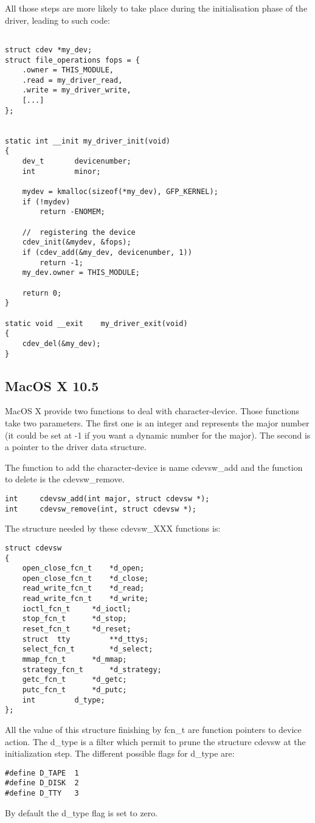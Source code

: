 \documentclass[11pt]{report}
\begin{document}
All those steps are more likely to take place during the initialisation phase
of the driver, leading to such code:

\begin{lstlisting}

struct cdev *my_dev;
struct file_operations fops = {
    .owner = THIS_MODULE,
    .read = my_driver_read,
    .write = my_driver_write,
    [...]
};


static int __init my_driver_init(void)
{
    dev_t       devicenumber;
    int         minor;
    
    mydev = kmalloc(sizeof(*my_dev), GFP_KERNEL);
    if (!mydev)
        return -ENOMEM;

    //  registering the device
    cdev_init(&mydev, &fops);
    if (cdev_add(&my_dev, devicenumber, 1))
        return -1;
    my_dev.owner = THIS_MODULE;

    return 0;
}

static void __exit    my_driver_exit(void)
{
    cdev_del(&my_dev);
}
\end{lstlisting}


\subsection{MacOS X 10.5}

MacOS X provide two functions to deal with character-device.
Those functions take two parameters. The first
one is an integer and represents the major number (it could
be set at -1 if you want a dynamic number for the major). The
second is a pointer to the driver data structure.

The function to add the character-device is name cdevsw\_add and 
the function to delete is the cdevsw\_remove.

\begin{lstlisting}
int		cdevsw_add(int major, struct cdevsw *);
int		cdevsw_remove(int, struct cdevsw *);
\end{lstlisting}

The structure needed by these cdevsw\_XXX functions is:

\begin{lstlisting}
struct cdevsw 
{
	open_close_fcn_t	*d_open;
	open_close_fcn_t	*d_close;
	read_write_fcn_t	*d_read;
	read_write_fcn_t	*d_write;
	ioctl_fcn_t		*d_ioctl;
	stop_fcn_t		*d_stop;
	reset_fcn_t		*d_reset;
	struct	tty 		**d_ttys;
	select_fcn_t		*d_select;
	mmap_fcn_t		*d_mmap;
	strategy_fcn_t		*d_strategy;
	getc_fcn_t		*d_getc;
	putc_fcn_t		*d_putc;
	int			d_type;
};
\end{lstlisting}
%
%
All the value of this structure finishing by fcn\_t are function pointers
to device action. The d\_type is a filter which permit to prune the structure
cdevsw at the initialization step. %
The different possible flags for d\_type are:
\begin{lstlisting}
#define	D_TAPE	1
#define	D_DISK	2
#define	D_TTY	3
\end{lstlisting}
By default the d\_type flag is set to zero.
\end{document}
